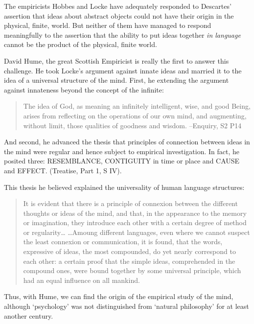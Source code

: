 The empiricists Hobbes and Locke have adequately responded to Descartes’ assertion that ideas about abstract objects could not have their origin in the physical, finite, world. But neither of them have managed to respond meaningfully to the assertion that the ability to put ideas together \emph{in language} cannot be the product of the physical, finite world.

David Hume, the great Scottish Empiricist is really the first to answer this challenge. He took Locke’s argument against innate ideas and married it to the idea of a universal structure of the mind. First, he extending the argument against innateness beyond the concept of the infinite:

\begin{quote}

The idea of God, as meaning an infinitely intelligent, wise, and good Being, arises from reflecting on the operations of our own mind, and augmenting, without limit, those qualities of goodness and wisdom. --Enquiry, S2 P14
\end{quote}

And second, he advanced the thesis that principles of connection between ideas in the mind were regular and hence subject to empirical investigation. In fact, he posited three: RESEMBLANCE, CONTIGUITY in time or place and CAUSE and EFFECT. (Treatise, Part 1, S IV). 

This thesis he believed explained the universality of human language structures:

\begin{quote}

It is evident that there is a principle of connexion between the different thoughts or ideas of the mind, and that, in the appearance to the memory or imagination, they introduce each other with a certain degree of method or regularity{\ldots} {\ldots}Amoung different languages, even where we cannot suspect the least connexion or communication, it is found, that the words, expressive of ideas, the most compounded, do yet nearly correspond to each other: a certain proof that the simple ideas, comprehended in the compound ones, were bound together by some universal principle, which had an equal influence on all mankind.
\end{quote}

Thus, with Hume, we can find the origin of the empirical study of the mind, although `psychology' was not distinguished from `natural philosophy' for at least another century.

